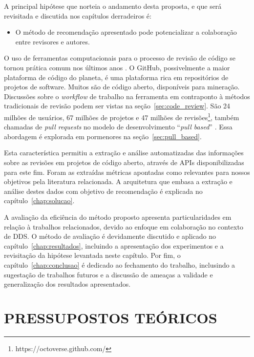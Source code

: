 \documentclass[
        12pt,
        openany, %
        oneside, %
        a4paper,
        english,
        brazil			        %
        ]{abntbibufjf}
\begin{document}
  A principal hipótese que norteia o andamento desta proposta, e que será revisitada e discutida nos capítulos derradeiros é:

  \begin{itemize}
    \item O método de recomendação apresentado pode potencializar a colaboração entre revisores e autores.
  \end{itemize}

  O uso de ferramentas computacionais para o processo de revisão de código se tornou prática comum nos últimos anos \cite{Bacchelli2013}. O GitHub, possivelmente a maior plataforma de código do planeta, é uma plataforma rica em repositórios de projetos de software. Muitos são de código aberto, disponíveis para mineração. Discussões sobre o \textit{workflow} de trabalho na ferramenta em contraponto à métodos tradicionais de revisão podem ser vistas na seção~\ref{sec:code_review}. São 24 milhões de usuários, 67 milhões de projetos e 47 milhões de revisões\footnote{https://octoverse.github.com/}, também chamadas de \textit{pull requests} no modelo de desenvolvimento ``\textit{pull based}'' \cite{gousios2014}. Essa abordagem é explorada em pormenores na seção~\ref{sec:pull_based}.

  Esta característica permitiu a extração e análise automatizadas das informações sobre as revisões em projetos de código aberto, através de APIs disponibilizadas para este fim. Foram as extraídas métricas apontadas como relevantes para nossos objetivos pela literatura relacionada. A arquitetura que embasa a extração e análise destes dados com objetivo de recomendação é explicada no capítulo~\ref{chap:solucao}.

  A avaliação da eficiência do método proposto apresenta particularidades em relação à trabalhos relacionados, devido ao enfoque em colaboração no contexto de DDS. O método de avaliação é devidamente discutido e aplicado no capítulo~\ref{chap:resultados}, incluindo a apresentação dos experimentos e a revisitação da hipótese levantada neste capítulo. Por fim, o capítulo~\ref{chap:conclusao} é dedicado ao fechamento do trabalho, inclusindo a sugestação de trabalhos futuros e a discussão de ameaças a validade e generalização dos resultados apresentados.


\chapter{PRESSUPOSTOS TEÓRICOS}\label{chap:metodos}
\end{document}
